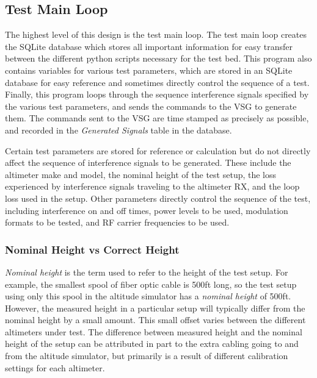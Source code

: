\subsection{Test Main Loop}
The highest level of this design is the test main loop. The test main loop creates the SQLite database which stores all important information for easy transfer between the different python scripts necessary for the test bed. This program also contains variables for various test parameters, which are stored in an SQLite database for easy reference and sometimes directly control the sequence of a test. Finally, this program loops through the sequence interference signals specified by the various test parameters, and sends the commands to the VSG to generate them. The commands sent to the VSG are time stamped as precisely as possible, and recorded in the \textit{Generated Signals} table in the database. 


Certain test parameters are stored for reference or calculation but do not directly affect the sequence of interference signals to be generated. These include the altimeter make and model, the nominal height of the test setup, the loss experienced by interference signals traveling to the altimeter RX, and the loop loss used in the setup. Other parameters directly control the sequence of the test, including interference on and off times, power levels to be used, modulation formats to be tested, and RF carrier frequencies to be used. 

\subsubsection{Nominal Height vs Correct Height}
\textit{Nominal height} is the term used to refer to the height of the test setup. For example, the smallest spool of fiber optic cable is 500ft long, so the test setup using only this spool in the altitude simulator has a \textit{nominal height} of 500ft.  However, the measured height in a particular setup will typically differ from the nominal height by a small amount.  This small offset varies between the different altimeters under test. The difference between measured height and the nominal height of the setup can be attributed in part to the extra cabling going to and from the altitude simulator, but primarily is a result of different calibration settings for each altimeter. 

